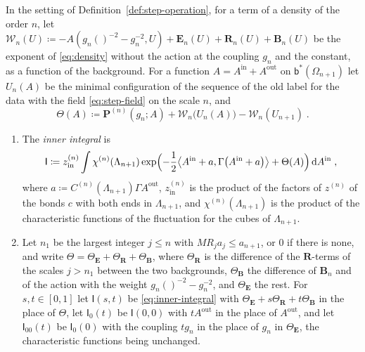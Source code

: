 \documentclass[11pt]{preprint}
\makeatletter
\newcommand{\dd}{\mathrm{d}}
\newcommand*{\bigcdot}{}%
\DeclareRobustCommand*{\bigcdot}{%
	\mathbin{\mathpalette\bigcdot@{}}%
}
\newcommand*{\bigcdot@scalefactor}{.7}
\newcommand*{\bigcdot@widthfactor}{1.15}
\newcommand*{\bigcdot@}[2]{%
	\sbox0{$#1\vcenter{}$}%
	\sbox2{$#1\cdot\m@th$}%
	\hbox to \bigcdot@widthfactor\wd2{%
		\hss
		\raise\ht0\hbox{%
			\scalebox{\bigcdot@scalefactor}{%
				\lower\ht0\hbox{$#1\bullet\m@th$}%
			}%
		}%
		\hss
	}%
}
\numberwithin{equation}{section}
\makeatother
\begin{document}
\begin{definition}\label{def:inner-integral}
In the setting of Definition~\ref{def:step-operation}, for a term of a density of the order $n$, let $\mathcal W_n(U) \coloneqq -A(g_n(\bigcdot)^{-2} - g_n^{-2}, U) + \mathbf E_n(U) + \mathbf R_n(U) + \mathbf B_n(U)$ be the exponent of \eqref{eq:density} without the action at the coupling $g_n$ and the constant, as a function of the background. For a function $A = A^{\mathrm{in}} + A^{\mathrm{out}}$ on $\mathsf b^*(\Omega_{n+1})$ let $U_n(A)$ be the minimal configuration of the sequence of the old label for the data with the field \eqref{eq:step-field} on the scale $n$, and
\begin{equation}\label{eq:inner-exponent}
    \Theta(A) \coloneqq \mathbf P^{(n)}(g_n; A) + \mathcal W_n\bigl(U_n(A)\bigr) - \mathcal W_n(U_{n+1})\;.
\end{equation}
\begin{enumerate}[label=(\roman*)]
\item The \emph{inner integral} is
\begin{equation}\label{eq:inner-integral}
    \mathsf I \coloneqq z^{(n)}_{\mathrm{in}}\int\chi^{(n)}(\Lambda_{n+1})\exp\Bigl(-\frac{1}{2}\bigl\langle A^{\mathrm{in}} + a, \Gamma\bigl(A^{\mathrm{in}} + a\bigr)\bigr\rangle + \Theta(A)\Bigr)\,\dd A^{\mathrm{in}}\;,
\end{equation}
where $a \coloneqq C^{(n)}(\Lambda_{n+1})\Gamma A^{\mathrm{out}}$, $z^{(n)}_{\mathrm{in}}$ is the product of the factors of $z^{(n)}$ of the bonds $c$ with both ends in $\Lambda_{n+1}$, and $\chi^{(n)}(\Lambda_{n+1})$ is the product of the characteristic functions of the fluctuation for the cubes of $\Lambda_{n+1}$.
\item Let $n_1$ be the largest integer $j \leqslant n$ with $MR_ja_j \leqslant a_{n+1}$, or $0$ if there is none, and write $\Theta = \Theta_{\mathbf E} + \Theta_{\mathbf R} + \Theta_{\mathbf B}$, where $\Theta_{\mathbf R}$ is the difference of the $\mathbf R$-terms of the scales $j > n_1$ between the two backgrounds, $\Theta_{\mathbf B}$ the difference of $\mathbf B_n$ and of the action with the weight $g_n(\bigcdot)^{-2} - g_n^{-2}$, and $\Theta_{\mathbf E}$ the rest. For $s, t \in [0, 1]$ let $\mathsf I(s, t)$ be \eqref{eq:inner-integral} with $\Theta_{\mathbf E} + s\Theta_{\mathbf R} + t\Theta_{\mathbf B}$ in the place of $\Theta$, let $\mathsf I_0(t)$ be $\mathsf I(0, 0)$ with $tA^{\mathrm{out}}$ in the place of $A^{\mathrm{out}}$, and let $\mathsf I_{00}(t)$ be $\mathsf I_0(0)$ with the coupling $tg_n$ in the place of $g_n$ in $\Theta_{\mathbf E}$, the characteristic functions being unchanged.
\end{enumerate}
\end{definition}
\end{document}
